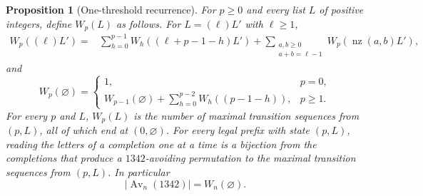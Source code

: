 \documentclass[11pt,reqno]{amsart}
\newtheorem{proposition}[proposition]{Proposition}
\theoremstyle{definition}
\theoremstyle{remark}
\newcommand{\Av}{\operatorname{Av}}
\newcommand{\nz}{\operatorname{nz}}
\begin{document}
\begin{proposition}[One-threshold recurrence]\label{prop:scalar-literal}
For $p\geq0$ and every list $L$ of positive integers, define $W_p(L)$ as
follows.  For $L=(\ell)L'$ with $\ell\geq1$,
\begin{align}
W_p((\ell)L')={}&\sum_{h=0}^{p-1}
 W_h\!\left((\ell+p-1-h)L'\right)
 +\sum_{\substack{a,b\geq0\\a+b=\ell-1}}W_p(\nz(a,b)L'), \label{eq:W}
\end{align}
and
\begin{equation}\label{eq:W-boundary}
 W_p(\varnothing)=
  \begin{cases}
   1,&p=0,\\
   W_{p-1}(\varnothing)+\sum_{h=0}^{p-2}W_h\!\left((p-1-h)\right),&p\geq1.
  \end{cases}
\end{equation}
For every $p$ and $L$, $W_p(L)$ is the number of maximal transition
sequences from $(p,L)$, all of which end at $(0,\varnothing)$.  For every
legal prefix with state $(p,L)$, reading the letters of a completion one at
a time is a bijection from the completions that produce a $1342$-avoiding
permutation to the maximal transition sequences from $(p,L)$.  In
particular
\begin{equation}\label{eq:W-initial}
 \lvert\Av_n(1342)\rvert=W_n(\varnothing).
\end{equation}
\end{proposition}
\end{document}
